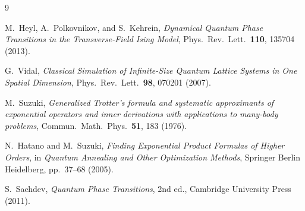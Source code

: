 \documentclass[11pt,a4paper]{article}
\begin{document}
\begin{thebibliography}{9}

M.~Heyl, A.~Polkovnikov, and S.~Kehrein,
\textit{Dynamical Quantum Phase Transitions in the Transverse-Field Ising Model},
Phys.~Rev.~Lett.~\textbf{110}, 135704 (2013).

G.~Vidal,
\textit{Classical Simulation of Infinite-Size Quantum Lattice Systems in One Spatial Dimension},
Phys.~Rev.~Lett.~\textbf{98}, 070201 (2007).

M.~Suzuki,
\textit{Generalized Trotter's formula and systematic approximants of exponential operators and inner derivations with applications to many-body problems},
Commun.~Math.~Phys.~\textbf{51}, 183 (1976).

N.~Hatano and M.~Suzuki,
\textit{Finding Exponential Product Formulas of Higher Orders},
in \textit{Quantum Annealing and Other Optimization Methods},
Springer Berlin Heidelberg, pp.~37--68 (2005).

S.~Sachdev,
\textit{Quantum Phase Transitions}, 2nd ed., Cambridge University Press (2011).

\end{thebibliography}
\end{document}
